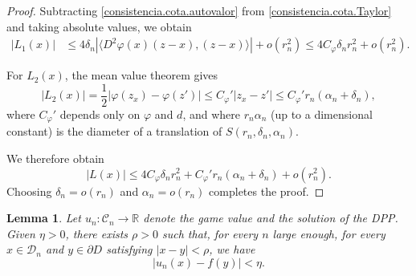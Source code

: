 \documentclass[11pt]{amsart}
\newtheorem{lemma}{Lemma}
\theoremstyle{definition}
\theoremstyle{remark}
\numberwithin{equation}{section}
\newcommand{\R}{{\mathbb R}}
\newcommand{\Domain}{\mathcal{D}}
\newcommand{\C}{{\mathcal C}}
\begin{document}
\begin{proof}
Subtracting \eqref{consistencia.cota.autovalor} from \eqref{consistencia.cota.Taylor} and taking absolute values, we obtain
\begin{align}
\label{consistencia.cota.L1}
|L_1(x)|
&\leq 
4\delta_n
|
\langle
D^2 \varphi(x)(z-x),(z-x)
\rangle
|
+
o(r_n^2)
\leq 
4C_{\varphi}\delta_n r_n^2 + o(r_n^2).
\end{align}

For $L_2(x)$, the mean value theorem gives
\begin{equation}
\label{consistencia.cota.2}
|L_2(x)|
= 
\frac{1}{2}
|
\varphi(z_x) 
-
\varphi(z') 
|
\leq
C_{\varphi}'
|z_x- z'|
\leq
C_{\varphi}' r_n (\alpha_n+\delta_n)
,
\end{equation}
where $C_{\varphi}'$ depends only on $\varphi$ and $d$, and where $r_n \alpha_n$ (up to a dimensional constant) is the diameter of a translation of $S(r_n,\delta_n,\alpha_n)$.

We therefore obtain 
\[
|L(x)|\leq 4 C_\varphi \delta_n r_n^2 + C_\varphi' r_n(\alpha_n+\delta_n) + o(r_n^2).
\]
Choosing $\delta_n = o(r_n)$ and $\alpha_n =o(r_n)$ completes the proof.
\end{proof}

\begin{lemma}
\label{LemaBorde}
Let $u_n\colon \C_n \to \R$ denote the game value and the solution of the DPP.
Given $\eta>0$, there exists $\rho>0$ such that, for every $n$ large enough, for every $x\in\Domain_n$ and $y\in\partial D$ satisfying $|x-y|<\rho$, we have
\[
|u_n(x)-f(y)|<\eta
.
\]  
\end{lemma}
\end{document}
